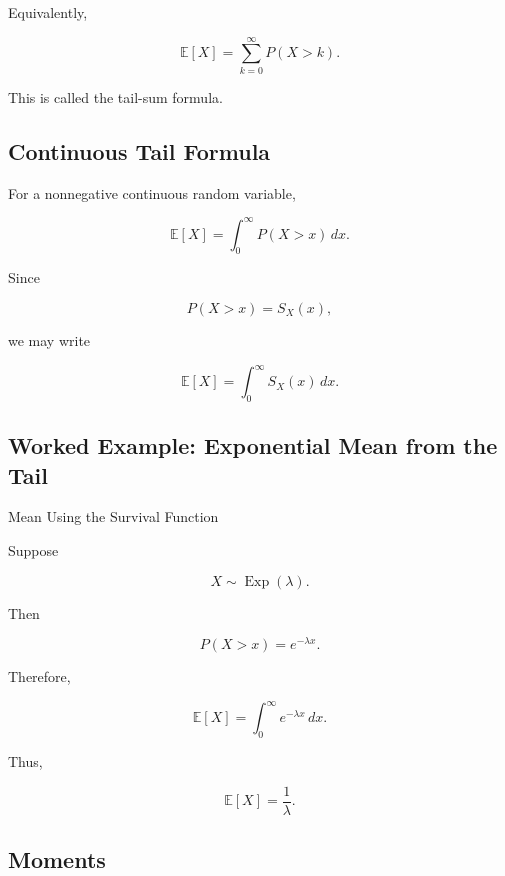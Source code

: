Equivalently,

\[
\boxed{
\mathbb{E}[X]
=
\sum_{k=0}^{\infty}
P(X>k).
}
\]

This is called the tail-sum formula.

\subsection{Continuous Tail Formula}
\label{subsec:continuous-tail-formula}

For a nonnegative continuous random variable,

\[
\boxed{
\mathbb{E}[X]
=
\int_0^\infty
P(X>x)\,dx.
}
\]

Since

\[
P(X>x)=S_X(x),
\]

we may write

\[
\boxed{
\mathbb{E}[X]
=
\int_0^\infty
S_X(x)\,dx.
}
\]

\subsection{Worked Example: Exponential Mean from the Tail}
\label{subsec:worked-exponential-tail-mean}

\begin{workedexamplebox}{Mean Using the Survival Function}

Suppose

\[
X\sim\operatorname{Exp}(\lambda).
\]

Then

\[
P(X>x)
=
e^{-\lambda x}.
\]

Therefore,

\[
\mathbb{E}[X]
=
\int_0^\infty
e^{-\lambda x}\,dx.
\]

Thus,

\begin{answerbox}
\[
\boxed{
\mathbb{E}[X]
=
\frac1\lambda.
}
\]
\end{answerbox}

\end{workedexamplebox}

\subsection{Moments}
\label{subsec:moments}

